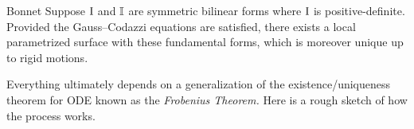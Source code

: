 % 
% 
% 
% 




\begin{thm}{Bonnet}{}
Suppose $\mathrm{I}$ and $\mathbb{I}$ are symmetric bilinear forms where $\mathrm{I}$ is positive-definite. Provided the Gauss--Codazzi equations are satisfied, there exists a local parametrized surface with these fundamental forms, which is moreover unique up to rigid motions.
\end{thm}

Everything ultimately depends on a generalization of the existence/uniqueness theorem for ODE known as the \emph{Frobenius Theorem.} Here is a rough sketch of how the process works. 

